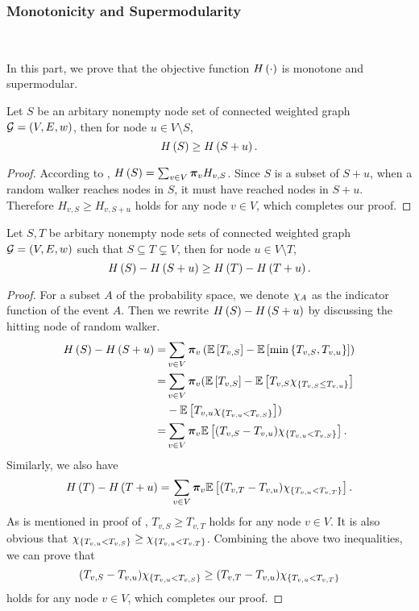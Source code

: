 \documentclass[sigconf]{acmart}
\begin{document}
\subsubsection{Monotonicity and Supermodularity}

\

In this part, we prove that the objective function \(H\left(\cdot\right)\) is monotone and supermodular.
\begin{theorem}[Monotonicity]\label{thm:mono}
  Let \(S\) be an arbitary nonempty node set of connected weighted graph \(\mathcal{G}=(V,E,w)\), then for node \(u\in V\setminus S\),
  \[H\left(S\right)\ge H\left(S+u\right).\]
\end{theorem}

\begin{proof}
  According to , \(H\left(S\right)=\sum_{v\in V}\boldsymbol{\pi}_vH_{v,S}\).
  Since \(S\) is a subset of \(S+u\), when a random walker reaches nodes in \(S\), it must have reached nodes in \(S+u\). Therefore \(H_{v,S}\ge H_{v,S+u}\) holds for any node \(v\in V\), which completes our proof.
\end{proof}

\begin{theorem}[Supermodularity]\label{thm:supermod}
  Let \(S,T\) be arbitary nonempty node sets of connected weighted graph \(\mathcal{G}=(V,E,w)\) such that \(S\subseteq T\subsetneq V\), then for node \(u\in V\setminus T\),
  \[H\left(S\right)-H\left(S+u\right)\ge H\left(T\right)-H\left(T+u\right).\]
\end{theorem}

\begin{proof}
  For a subset \(A\) of the probability space, we denote \(\chi_{A}\) as the indicator function of the event \(A\). Then we rewrite \(H\left(S\right)-H\left(S+u\right)\) by discussing the hitting node of random walker.
  \begin{align*}
    H\left(S\right)-H\left(S+u\right)
    = & \sum_{v\in V}\boldsymbol{\pi}_v\left( \mathbb{E}\left[T_{v,S}\right]-\mathbb{E}\left[\min\left\{T_{v,S},T_{v,u} \right\}\right] \right)          \\
    = & \sum_{v\in V}\boldsymbol{\pi}_v(\mathbb{E}\left[T_{v,S}\right]-\mathbb{E}\left[T_{v,S}\chi_{\left\{T_{v,S}\le T_{v,u} \right\}}\right] \\
      & -\mathbb{E}\left[T_{v,u}\chi_{\left\{T_{v,u}<T_{v,S} \right\}}\right])                                       \\
    = & \sum_{v\in V}\boldsymbol{\pi}_v\mathbb{E}\left[(T_{v,S}-T_{v,u})\chi_{\left\{T_{v,u}<T_{v,S} \right\}}\right].
  \end{align*}
  Similarly, we also have
  \[H\left(T\right)-H\left(T+u\right)=\sum_{v\in V}\boldsymbol{\pi}_v\mathbb{E}\left[(T_{v,T}-T_{v,u})\chi_{\left\{T_{v,u}<T_{v,T} \right\}}\right].\]
  As is mentioned in proof of , \(T_{v,S}\ge T_{v,T}\) holds for any node \(v\in V\).
  It is also obvious that \(\chi_{\left\{T_{v,u}<T_{v,S} \right\}}\ge\chi_{\left\{T_{v,u}<T_{v,T} \right\}}\).
  Combining the above two inequalities, we can prove that
  \[(T_{v,S}-T_{v,u})\chi_{\left\{T_{v,u}<T_{v,S} \right\}}\ge(T_{v,T}-T_{v,u})\chi_{\left\{T_{v,u}<T_{v,T} \right\}}\]
  holds for any node \(v\in V\), which completes our proof.
\end{proof}
\end{document}
